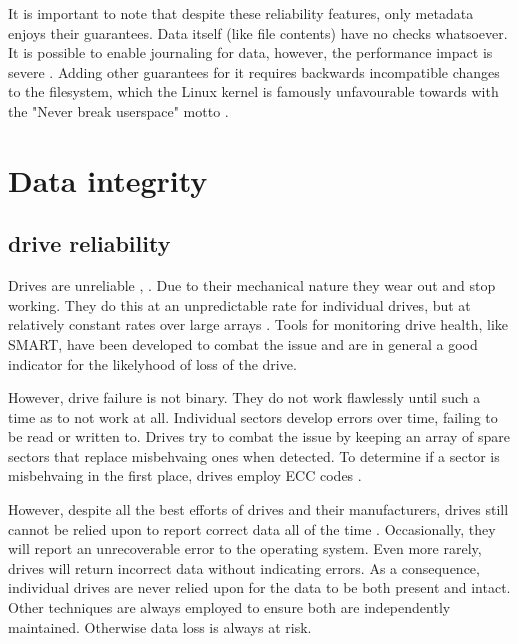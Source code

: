             It is important to note that despite these reliability features,
            only metadata enjoys their guarantees. Data itself (like file
            contents) have no checks whatsoever. It is possible to enable
            journaling for data, however, the performance impact is severe
            \cite{ext4_docs}. Adding other guarantees for it requires backwards
            incompatible changes to the filesystem, which the Linux kernel is
            famously unfavourable towards with the "Never break userspace"
            motto \cite{never_break_userspace}.

    \section{Data integrity}

        \subsection{drive reliability}
            \label{sec_reliability}

            Drives are unreliable \cite{RAID}, \cite{Backblaze_stats}. Due to
            their mechanical nature they wear out and stop working. They do
            this at an unpredictable rate for individual drives, but at
            relatively constant rates over large arrays \cite{Backblaze_stats}.
            Tools for monitoring drive health, like SMART, have been developed
            to combat the issue and are in general a good indicator for the
            likelyhood of loss of the drive.

            However, drive failure is not binary. They do not work flawlessly
            until such a time as to not work at all. Individual sectors develop
            errors over time, failing to be read or written to.  Drives try to
            combat the issue by keeping an array of spare sectors that replace
            misbehvaing ones when detected. To determine if a sector is
            misbehvaing in the first place, drives employ ECC codes
            \cite{data_corruption_storage_stack}.

            However, despite all the best efforts of drives and their
            manufacturers, drives still cannot be relied upon to report correct
            data all of the time \cite{data_corruption_storage_stack}.
            Occasionally, they will report an unrecoverable error to the
            operating system. Even more rarely, drives will return incorrect
            data without indicating errors. As a consequence, individual drives
            are never relied upon for the data to be both present and intact.
            Other techniques are always employed to ensure both are
            independently maintained. Otherwise data loss is always at risk.

